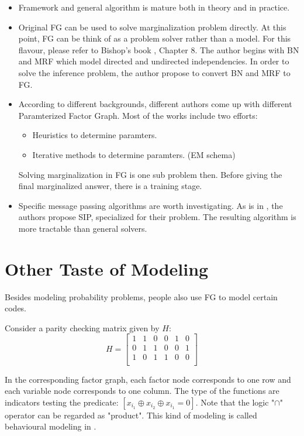 \documentclass[11pt,a4paper]{article}
\begin{document}
\begin{itemize}
	\item Framework and general algorithm is mature both in 
	theory and in practice. 
	\item Original FG can be used to solve marginalization problem 
	directly. At this point, FG can be think of as a problem solver
	rather than a model. For this flavour, please refer to Bishop's book
	\cite{bishop2006pattern}, Chapter 8. The author begins with 
	BN and MRF which model directed and undirected independencies. 
	In order to solve the inference problem, the author propose to 
	convert BN and MRF to FG. 
	\item According to different backgrounds, different authors 
	come up with different Paramterized Factor Graph. 
	Most of the works include two efforts: 
		\begin{itemize}
			\item Heuristics to determine paramters. 
			\item Iterative methods to determine paramters. 
			(EM schema)
		\end{itemize}			
	Solving marginalization in FG is one sub problem then. Before
	giving the final marginalized answer, there is a training stage. 
	\item Specific message passing algorithms are worth investigating. 
	As is in \cite{wang2011-dynamic}, the authors propose SIP, specialized 
	for their problem. The resulting algorithm is more tractable than 
	general solvers. 
\end{itemize}

\section{Other Taste of Modeling}

Besides modeling probability problems, people also use FG to 
model certain codes. 

Consider a parity checking matrix given by $H$:
\begin{equation}
	H = \left[
	\begin{matrix}
		1 & 1 & 0 & 0 & 1 & 0 \\
0 & 1 & 1 & 0 & 0 & 1 \\
1 & 0 & 1 & 1 & 0 & 0 \\
	\end{matrix}
	\right]
\end{equation}

In the corresponding factor graph, each factor node corresponds
to one row and each variable node corresponds to one column. The 
type of the functions are indicators testing the predicate:
$[x_{i_1} \oplus x_{i_2} \oplus x_{i_1} = 0]$. Note that 
the logic "$\cap$" operator can be regarded as "product". 
This kind of modeling is called behavioural modeling in 
\cite{kschischang2001factor}. 
\end{document}
